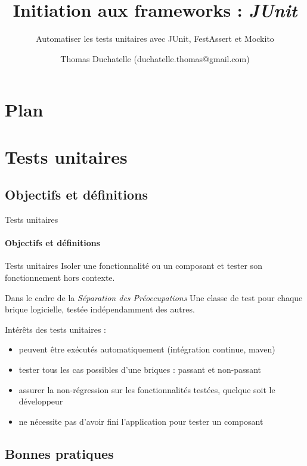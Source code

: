 \documentclass[compress]{beamer}%
\title{Initiation aux frameworks : \emph{JUnit}}
\subtitle{Automatiser les tests unitaires avec JUnit, FestAssert et Mockito}
\author{Thomas Duchatelle (duchatelle.thomas@gmail.com)}
\institute{Capgemini, pour Yves Rocher}
\begin{document}
\frame{\titlepage}
  
\section*{Plan}
\frame{\tableofcontents[hideallsubsections]}



\section{Tests unitaires}

\subsection{Objectifs et définitions}

\begin{frame}{Tests unitaires}
	\framesubtitle{Objectifs et définitions}
	
	\begin{block}{Tests unitaires}
		Isoler une fonctionnalité ou un composant et tester son fonctionnement hors contexte. 
	\end{block}
	
	\pause
	\begin{block}{Dans le cadre de la \emph{Séparation des Préoccupations}}
		Une classe de test pour chaque brique logicielle, testée indépendamment des autres.
	\end{block}
	
\end{frame}

\begin{frame}
	
	Intérêts des tests unitaires :
	\begin{itemize}[<+->]
	\item peuvent être exécutés automatiquement (intégration continue, maven)
	\item tester tous les cas possibles d'une briques : passant et non-passant
	\item assurer la non-régression sur les fonctionnalités testées, quelque soit le développeur
	\item ne nécessite pas d'avoir fini l'application pour tester un composant
	\end{itemize}
	
\end{frame}

\subsection{Bonnes pratiques}
\end{document}
